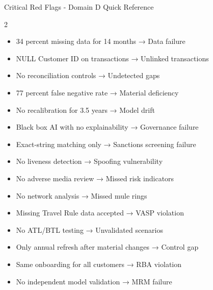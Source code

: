 \documentclass[11pt,a4paper]{beamer}
\begin{document}
\begin{frame}{Critical Red Flags - Domain D Quick Reference}
	\begin{multicols}{2}
		\begin{itemize}
			\item 34 percent missing data for 14 months → Data failure
			\item NULL Customer ID on transactions → Unlinked transactions
			\item No reconciliation controls → Undetected gaps
			\item 77 percent false negative rate → Material deficiency
			\item No recalibration for 3.5 years → Model drift
			\item Black box AI with no explainability → Governance failure
			\item Exact-string matching only → Sanctions screening failure
			\item No liveness detection → Spoofing vulnerability
			\item No adverse media review → Missed risk indicators
			\item No network analysis → Missed mule rings
			\item Missing Travel Rule data accepted → VASP violation
			\item No ATL/BTL testing → Unvalidated scenarios
			\item Only annual refresh after material changes → Control gap
			\item Same onboarding for all customers → RBA violation
			\item No independent model validation → MRM failure
		\end{itemize}
	\end{multicols}
\end{frame}
\end{document}
